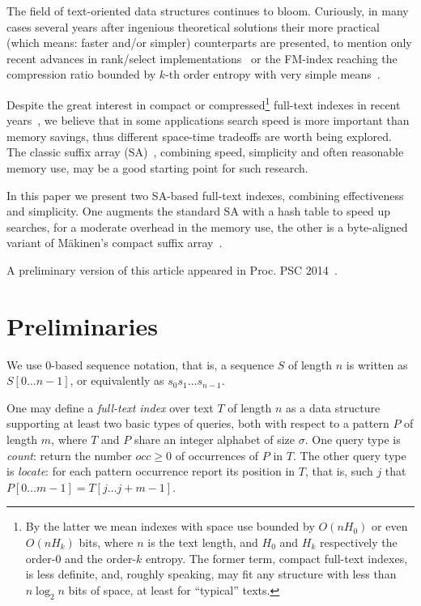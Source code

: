 \documentclass{cai}
\begin{document}
The field of text-oriented data structures continues to bloom.
Curiously, in many cases several years after ingenious theoretical solutions
their more practical (which means: faster and/or simpler) counterparts are presented, 
to mention only recent advances in rank/select implementations~\cite{GP14} 
or the FM-index reaching the compression ratio bounded by $k$-th order
entropy with very simple means~\cite{DBLP:conf/spire/KarkkainenP11}.

Despite the great interest in compact or compressed\footnote{By the latter we mean indexes with space use bounded by $O(n H_0)$ or even 
$O(n H_k)$ bits,  where $n$ is the text length,
and $H_0$ and $H_k$ respectively the order-0 and the order-$k$ entropy.
The former term, compact full-text indexes, is less definite, 
and, roughly speaking, may fit any structure with less than $n\log_2 n$ 
bits of space, at least for ``typical'' texts.}
full-text indexes in recent years~\cite{NMacmcs06}, we believe that in 
some applications search speed is more important than memory savings, thus 
different space-time tradeoffs are worth being explored.
The classic suffix array (SA)~\cite{MM90}, combining speed, simplicity and often 
reasonable memory use, may be a good starting point for such research.

In this paper we present two SA-based full-text indexes, combining effectiveness 
and simplicity.
One augments the standard SA with a hash table to speed up searches, 
for a moderate overhead in the memory use, 
the other is a byte-aligned variant of M{\"a}kinen's compact 
suffix array~\cite{DBLP:conf/cpm/Makinen00,DBLP:journals/fuin/Makinen03}.

A preliminary version of this article appeared in Proc. PSC 2014~\cite{GR14}.

\section{Preliminaries}
\label{sec:prelim}

We use 0-based sequence notation, that is, a sequence $S$ of length $n$ 
is written as $S[0 \ldots n-1]$, or equivalently as $s_0 s_1 \ldots s_{n-1}$.

One may define a {\em full-text index} over text $T$ of length $n$ 
as a data structure supporting at least two basic types of queries, 
both with respect to a pattern $P$ of length $m$, 
where $T$ and $P$ share an integer alphabet of size $\sigma$.
One query type is {\em count}: return the number $occ \geq 0$ of occurrences 
of $P$ in $T$.
The other query type is {\em locate}: for each pattern occurrence 
report its position in $T$, that is, such $j$ that $P[0 \ldots m-1] = T[j \ldots j+m-1]$.
\end{document}
